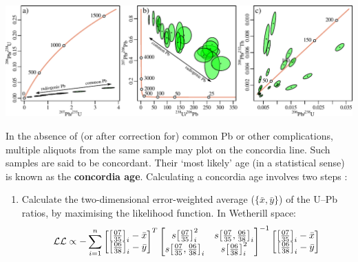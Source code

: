 \begin{refsection}
\noindent\includegraphics[width=\textwidth]{../figures/3xconcordia.pdf}
\begingroup {}\endgroup

In the absence of (or after correction for) common Pb or other
complications, multiple aliquots from the same sample may plot on the
concordia line. Such samples are said to be concordant. Their `most
likely' age (in a statistical sense) is known as the \textbf{concordia
  age}. Calculating a concordia age involves two steps
\citep{ludwig1998}:

\begin{enumerate}
  \item Calculate the two-dimensional error-weighted average
    ($\{\bar{x},\bar{y}\}$) of the U--Pb ratios, by maximising the
    likelihood function. In Wetherill space:
    \[
    \mathcal{LL} \propto
    - \sum\limits_{i=1}^{n}
    \left[
      \begin{array}{@{}c@{}}
        \left[\frac{07}{35}\right]_i-\bar{x}\\
        \left[\frac{06}{38}\right]_i-\bar{y}
      \end{array}
      \right]^T
    \left[
      \begin{array}{@{}cc@{}}
        s\!\left[\frac{07}{35}\right]_i^2 &
        s\!\left[\frac{07}{35},\frac{06}{38}\right]_i\\
        s\!\left[\frac{07}{35},\frac{06}{38}\right]_i &
        s\!\left[\frac{06}{38}\right]_i^2
      \end{array}
      \right]^{-1}
    \left[
      \begin{array}{@{}c@{}}
        \left[\frac{07}{35}\right]_i-\bar{x}\\
        \left[\frac{06}{38}\right]_i-\bar{y}
      \end{array}
      \right]    
    \]


\end{enumerate}
\end{refsection}
